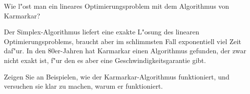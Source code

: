 \begin{aufgabe}
Wie l"ost man ein lineares Optimierungsproblem mit dem Algorithmus von
Karmarkar?
\end{aufgabe}

{\parindent 0pt Der Simplex-Algorithmus} liefert eine exakte
L"osung des linearen Optimierungsproblems, braucht aber im
schlimmsten Fall exponentiell viel Zeit daf"ur. In den 80er-Jahren
hat Karmarkar einen Algorithmus gefunden, der zwar nicht exakt
ist, f"ur den es aber eine Geschwindigkeitsgarantie gibt.

Zeigen Sie an Beispielen, wie der Karmarkar-Algorithmus funktioniert,
und versuchen sie klar zu machen, warum er funktioniert.

